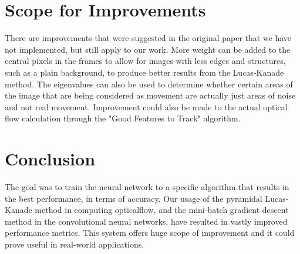 \documentclass[]{article}
\begin{document}
\section{Scope for Improvements}\label{sec:improvements}
There are improvements that were suggested in the original paper that we have not implemented, but still apply to our work.
More weight can be added to the central pixels in the frames to allow for images with less edges and structures, such as a plain background, to produce better results from the Lucas-Kanade method.
The eigenvalues can also be used to determine whether certain areas of the image that are being considered as movement are actually just areas of noise and not real movement.
Improvement could also be made to the actual optical flow calculation through the "Good Features to Track" algorithm.\cite{features}

\section{Conclusion}\label{sec:conclusion}
The goal was to train the neural network to a specific algorithm that results in the best performance, in terms of accuracy.
Our usage of the pyramidal Lucas-Kanade method in computing opticalflow, and the mini-batch gradient descent method in the convolutional neural networks, have resulted in vastly improved performance metrics.
This system offers huge scope of improvement and it could prove useful in real-world applications.

\listoffigures

\printbibliography
\end{document}
